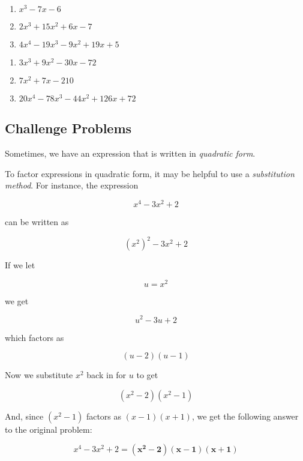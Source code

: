 \documentclass{article}
\newcounter{PS}
\begin{document}
\begin{multicols}{3}
\begin{enumerate}
\setcounter{enumi}{\value{PS}}
    \item \quad $x^3 - 7x - 6$
    \item \quad $2x^3 + 15x^2 + 6x - 7$
    \item \quad $4x^4 - 19x^3 - 9x^2 + 19x + 5$
\setcounter{PS}{\value{enumi}}
\end{enumerate}
\end{multicols}
\vfill

\begin{multicols}{3}
\begin{enumerate}
\setcounter{enumi}{\value{PS}}
    \item \quad $3x^3 + 9x^2 - 30x - 72$
    \item \quad $7x^2 + 7x - 210$
    \item \quad $20 x^4 - 78 x^3 - 44 x^2 + 126 x + 72$
\setcounter{PS}{\value{enumi}}
\end{enumerate}
\end{multicols}
\vfill


\newpage

\subsection*{Challenge Problems}

Sometimes, we have an expression that is written in \textit{quadratic form}. 

To factor expressions in quadratic form, it may be helpful to use a \textit{substitution method}. For instance, the expression

\[    x^4 - 3x^2 + 2    \]

can be written as 

\[  \left(x^2\right)^2 - 3x^2 + 2 \]

If we let 

\[  u = x^2 \]

we get

\[  u^2 - 3u + 2 \]

which factors as 

\[  (u - 2)(u - 1) \]

Now we substitute $x^2$ back in for $u$ to get

\[  (x^2-2)(x^2-1) \]
\smallskip

And, since $(x^2 - 1)$ factors as $(x-1)(x+1)$, we get the following answer to the original problem:

\[  x^4 - 3x^2 + 2 = \bm{(x^2-2)(x-1)(x+1)} \]
\bigskip
\end{document}
